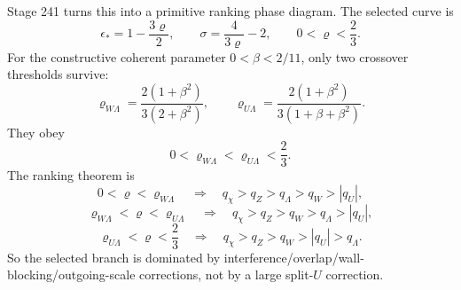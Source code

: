 Stage 241 turns this into a primitive ranking phase diagram.  The selected curve is
\begin{equation}
\label{eq:app-part07-selected-curve}
\epsilon_* = 1-\frac{3\varrho}{2},
\qquad
\sigma=\frac{4}{3\varrho}-2,
\qquad
0<\varrho<\frac23.
\end{equation}
For the constructive coherent parameter \(0<\beta<2/11\), only two crossover thresholds survive:
\begin{equation}
\label{eq:app-part07-ranking-thresholds}
\varrho_{W\Lambda}
=
\frac{2(1+\beta^2)}{3(2+\beta^2)},
\qquad
\varrho_{U\Lambda}
=
\frac{2(1+\beta^2)}{3(1+\beta+\beta^2)}.
\end{equation}
They obey
\begin{equation}
\label{eq:app-part07-threshold-order}
0<\varrho_{W\Lambda}<\varrho_{U\Lambda}<\frac23.
\end{equation}
The ranking theorem is
\begin{equation}
\label{eq:app-part07-ranking-region-i}
0<\varrho<\varrho_{W\Lambda}
\quad\Longrightarrow\quad
q_\chi>q_Z>q_\Lambda>q_W>|q_U|,
\end{equation}
\begin{equation}
\label{eq:app-part07-ranking-region-ii}
\varrho_{W\Lambda}<\varrho<\varrho_{U\Lambda}
\quad\Longrightarrow\quad
q_\chi>q_Z>q_W>q_\Lambda>|q_U|,
\end{equation}
\begin{equation}
\label{eq:app-part07-ranking-region-iii}
\varrho_{U\Lambda}<\varrho<\frac23
\quad\Longrightarrow\quad
q_\chi>q_Z>q_W>|q_U|>q_\Lambda.
\end{equation}
So the selected branch is dominated by interference/overlap/wall-blocking/outgoing-scale corrections, not by a large split-\(U\) correction.

